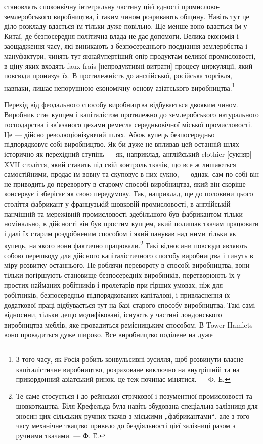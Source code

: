 становлять споконвічну інтегральну частину цієї єдності промислово-землеробського
виробництва, і таким чином розривають
общину. Навіть тут це діло розкладу вдається їм тільки дуже
повільно. Ще менше воно вдається їм у Китаї, де безпосередня
політична влада не дає допомоги. Велика економія і заощадження
часу, які виникають з безпосереднього поєднання землеробства
і мануфактури, чинять тут якнайупертіший опір продуктам
великої промисловості, в ціну яких входять faux frais [непродуктивні
витрати] процесу циркуляції, який повсюди пронизує
їх. В протилежність до англійської, російська торгівля, навпаки,
лишає непорушною економічну основу азіатського виробництва.\footnote{
З того часу, як Росія робить конвульсивні зусилля, щоб розвинути
власне капіталістичне виробництво, розраховане виключно на внутрішній та
на прикордонний азіатський ринок, це теж починає мінятися. — Ф. Е.
}

Перехід від феодального способу виробництва відбувається
двояким чином. Виробник стає купцем і капіталістом протилежно
до землеробського натурального господарства і зв’язаного цехами
ремесла середньовічної міської промисловості. Це — дійсно
революціонізуючий шлях. Абож купець безпосередньо підпорядковує
собі виробництво. Як би дуже не впливав цей останній
шлях історично як перехідний ступінь — як, наприклад, англійський
clothier [сукняр] XVII століття, який ставить під свій контроль
ткачів, що все ж лишаються самостійними, продає їм вовну
та скуповує в них сукно, — однак, сам по собі він не приводить
до перевороту в старому способі виробництва, який він скоріше
консервує і зберігає як свою передумову. Так, наприклад, ще
до половини цього століття фабрикант у французькій шовковій
промисловості, в англійській панчішній та мережівній промисловості
здебільшого був фабрикантом тільки номінально, в дійсності
він був простим купцем, який полишав ткачам працювати
і далі їх старим роздрібненим способом і який панував над ними
тільки як купець, на якого вони фактично працювали.\footnote{
Те саме стосується і до рейнської стрічкової і позументної промисловості
та шовкоткацтва. Біля Крефельда була навіть збудована спеціальна залізниця
для зносин цих сільських ручних ткачів з міськими „фабрикантами“, але
з того часу механічне ткацтво привело до бездіяльності цієї залізниці разом
з ручними ткачами. — Ф. Е.
} Такі
відносини повсюди являють собою перешкоду для дійсного капіталістичного
способу виробництва і гинуть в міру розвитку останнього.
Не роблячи перевороту в способі виробництва, вони тільки
погіршують становище безпосередніх виробників, перетворюють
їх у простих найманих робітників і пролетарів при гірших умовах,
ніж для робітників, безпосередньо підпорядкованих капіталові,
і привласнення їх додаткової праці відбувається тут на базі старого
способу виробництва. Такі самі відносини, тільки дещо модифіковані,
існують у частині лондонського виробництва меблів,
яке провадиться ремісницьким способом. В Tower Hamlets воно
провадиться дуже широко. Все виробництво поділене на дуже